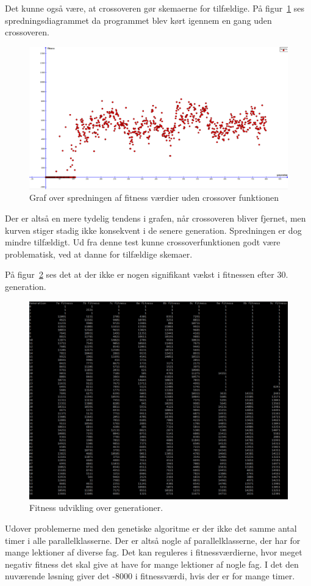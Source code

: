 Det kunne også være, at crossoveren gør skemaerne for tilfældige. På figur~\ref{fig:spredningudencrossover} ses spredningsdiagrammet da programmet blev kørt igennem en gang uden crossoveren.
\begin{figure}[!h]
\centering
\includegraphics[scale = 0.2]{partials/graphics/spredningudencrossover.png}
\caption{Graf over spredningen af fitness værdier uden crossover funktionen}
\label{fig:spredningudencrossover}
\end{figure}
Der er altså en mere tydelig tendens i grafen, når crossoveren bliver fjernet, men kurven stiger stadig ikke konsekvent i de senere generation. Spredningen er dog mindre tilfældigt. Ud fra denne test kunne crossoverfunktionen godt være problematisk, ved at danne for tilfældige skemaer. 

På figur~\ref{fig:generationsfitness} ses det at der ikke er nogen signifikant vækst i fitnessen efter 30. generation.

\begin{figure}[!h]
\centering
\includegraphics[scale = 0.4]{partials/graphics/generationsfitness.png}
\caption{Fitness udvikling over generationer.}
\label{fig:generationsfitness}
\end{figure}

Udover problemerne med den genetiske algoritme er der ikke det samme antal timer i alle parallelklasserne. Der er altså nogle af parallelklasserne, der har for mange lektioner af diverse fag. Det kan reguleres i fitnessværdierne, hvor meget negativ fitness det skal give at have for mange lektioner af nogle fag. I det den nuværende løsning giver det -8000 i fitnessværdi, hvis der er for mange timer.
